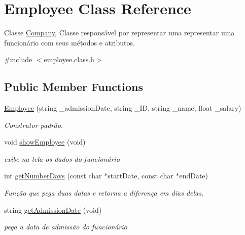 \hypertarget{classEmployee}{}\section{Employee Class Reference}
\label{classEmployee}


Classe \hyperlink{classCompany}{Company}, Classe responsável por representar uma representar uma funcionário com seus métodos e atributos.  




{\ttfamily \#include $<$employee.\+class.\+h$>$}

\subsection*{Public Member Functions}
\begin{DoxyCompactItemize}
\item 
\hyperlink{classEmployee_ac411d8f01914f59c615773fad6384b2b}{Employee} (string \+\_\+admission\+Date, string \+\_\+\+ID, string \+\_\+name, float \+\_\+salary)
\begin{DoxyCompactList}\small\item\em Construtor padrão. \end{DoxyCompactList}\item 
\mbox{\label{classEmployee_ae6672e2f760a9148f07776e3f04c4257}} 
void \hyperlink{classEmployee_ae6672e2f760a9148f07776e3f04c4257}{show\+Employee} (void)
\begin{DoxyCompactList}\small\item\em exibe na tela os dados do funcionário \end{DoxyCompactList}\item 
int \hyperlink{classEmployee_ad574b1f31281cc974c9020418a040f0a}{get\+Number\+Days} (const char $\ast$start\+Date, const char $\ast$end\+Date)
\begin{DoxyCompactList}\small\item\em Função que pega duas datas e retorna a diferença em dias delas. \end{DoxyCompactList}\item 
string \hyperlink{classEmployee_a4c5366486364f7c2d932bcb50b3f2cda}{get\+Admission\+Date} (void)
\begin{DoxyCompactList}\small\item\em pega a data de admissão do funcionário \end{DoxyCompactList}\item 

\end{DoxyCompactItemize}

